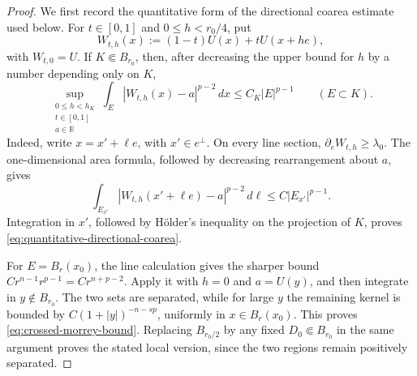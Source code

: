 \documentclass[11pt,reqno]{amsart}
\numberwithin{equation}{section}
\newcommand{\R}{\mathbb R}
\newcommand{\dd}{\,d}
\theoremstyle{remark}
\begin{document}
\begin{proof}
We first record the quantitative form of the directional coarea
estimate used below.  For \(t\in[0,1]\) and \(0\le h<r_0/4\), put
\[
 W_{t,h}(x):=(1-t)U(x)+tU(x+he),
\]
with \(W_{t,0}=U\).  If \(K\Subset B_{r_0}\), then, after decreasing
the upper bound for \(h\) by a number depending only on \(K\),
\begin{equation}
 \sup_{\substack{0\le h<h_K\\t\in[0,1]\\a\in\R}}
 \int_E|W_{t,h}(x)-a|^{p-2}\dd x
 \le C_K|E|^{p-1}
 \qquad(E\subset K).
 \label{eq:quantitative-directional-coarea}
\end{equation}
Indeed, write \(x=x'+\ell e\), with \(x'\in e^\perp\).
On every line section, \(\partial_eW_{t,h}\ge\lambda_0\).  The
one-dimensional area formula, followed by decreasing rearrangement
about \(a\), gives
\[
 \int_{E_{x'}}|W_{t,h}(x'+\ell e)-a|^{p-2}\dd\ell
 \le C|E_{x'}|^{p-1}.
\]
Integration in \(x'\), followed by H\"older's inequality on the
projection of \(K\), proves
\eqref{eq:quantitative-directional-coarea}.

For \(E=B_r(x_0)\), the line calculation gives the sharper bound
\(Cr^{n-1}r^{p-1}=Cr^{n+p-2}\).  Apply it with \(h=0\) and
\(a=U(y)\), and then integrate in \(y\notin B_{r_0}\).  The two sets
are separated, while for large \(y\) the remaining kernel is bounded
by \(C(1+|y|)^{-n-sp}\), uniformly in \(x\in B_r(x_0)\).
This proves \eqref{eq:crossed-morrey-bound}.
Replacing \(B_{r_0/2}\) by any fixed \(D_0\Subset B_{r_0}\) in the
same argument proves the stated local version, since the two regions
remain positively separated.


\end{proof}
\end{document}
